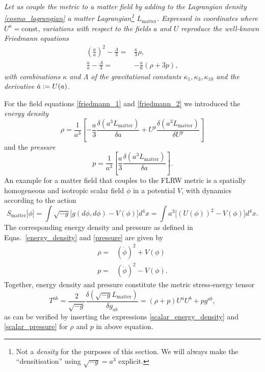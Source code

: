 \itshape
Let us couple the metric to a matter field by adding to the Lagrangian density \eqref{cosmo_lagrangian} a matter Lagrangian\footnote{Not a \emph{density} for the purposes of this section. We will always make the ``densitisation'' using $\sqrt{-g} = a^3$ explicit.} $L_\text{matter}$. Expressed in coordinates where $U^a = \text{const}$, variations with respect to the fields $a$ and $U$ reproduce the well-known \emph{Friedmann equations} \cite{Friedman_1922}
\begin{align}
  \left(\frac{\dot a}{a}\right)^2 - \frac{\Lambda}{3} = {} & \frac{\kappa}{3} \rho, \label{friedmann_1}\\
  \frac{\ddot a}{a} - \frac{\Lambda}{3} = {} & -\frac{\kappa}{6}(\rho + 3 p), \label{friedmann_2}
\end{align}
with combinations $\kappa$ and $\Lambda$ of the gravitational constants $\kappa_1,\kappa_3,\kappa_{10}$ and the derivative $\dot a \vcentcolon= U(a)$.

For the field equations \eqref{friedmann_1} and \eqref{friedmann_2} we introduced the \emph{energy density}
\begin{equation}\label{energy_density}
  \rho = \frac{1}{a^3}\left\lbrack -\frac{a}{3} \frac{\delta(a^3 L_\text{matter})}{\delta a} + U^p \frac{\delta(a^3L_\text{matter})}{\delta U^p}\right\rbrack
\end{equation}
and the \emph{pressure}
\begin{equation}\label{pressure}
  p = \frac{1}{a^3} \left\lbrack \frac{a}{3} \frac{\delta(a^3L_\text{matter})}{\delta a}\right\rbrack.
\end{equation}
An example for a matter field that couples to the FLRW metric is a spatially homogeneous and isotropic scalar field $\phi$ in a potential $V$, with dynamics according to the action
\begin{equation}
  S_\text{matter}\lbrack\phi\rbrack = \int \sqrt{-g}\lbrack g(d\phi,d\phi) - V(\phi)\rbrack d^4x = \int a^3\lbrack (U(\phi))^2 - V(\phi)\rbrack d^4x.
\end{equation}
The corresponding energy density and pressure as defined in Eqns.~\eqref{energy_density} and \eqref{pressure} are given by
\begin{align}
  \rho = {} & (\dot\phi)^2 + V(\phi) \label{scalar_energy_density}\\
  p = {} & (\dot\phi)^2 - V(\phi) \label{scalar_pressure}.
\end{align}
Together, energy density and pressure constitute the metric stress-energy tensor
\begin{equation}
  T^{ab} = \frac{2}{\sqrt{-g}}\frac{\delta(\sqrt{-g}L_\text{matter})}{\delta g_{ab}} = (\rho + p)U^aU^b + pg^{ab},
\end{equation}
as can be verified by inserting the expressions \eqref{scalar_energy_density} and \eqref{scalar_pressure} for $\rho$ and $p$ in above equation.

